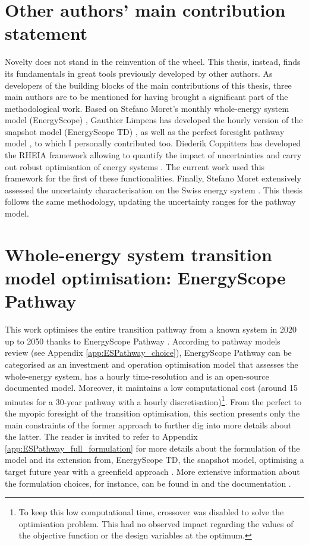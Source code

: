 \section*{Other authors' main contribution statement}
Novelty does not stand in the reinvention of the wheel.  This thesis, instead, finds its fundamentals in great tools previously developed by other authors. As developers of the building blocks of the main contributions of this thesis, three main authors are to be mentioned for having brought a significant part of the methodological work. Based on Stefano Moret's monthly whole-energy system model (\ie EnergyScope) \cite{moret2016strategic}, Gauthier Limpens has developed the hourly version of the snapshot model (\ie EnergyScope TD) \cite{limpens2019energyscope}, as well as the perfect foresight pathway model \cite{limpens2024pathway}, to which I personally contributed too. Diederik Coppitters has developed the RHEIA framework allowing to quantify the impact of uncertainties and carry out robust optimisation of energy systems \cite{coppittersthesis}. The current work used this framework for the first of these functionalities. Finally, Stefano Moret extensively assessed the uncertainty characterisation on the Swiss energy system \cite{Moret2017}. This thesis follows the same methodology, updating the uncertainty ranges for the pathway model.

\section[EnergyScope Pathway]{Whole-energy system transition model optimisation: EnergyScope Pathway}
\label{sec:meth:ES}

This work optimises the entire transition pathway from a known system in 2020 up to 2050 thanks to EnergyScope Pathway \cite{limpens2024pathway}. According to pathway models review (see Appendix \ref{app:ESPathway_choice}), EnergyScope Pathway can be categorised as an investment and operation optimisation model that assesses the whole-energy system, has a hourly time-resolution and is an open-source documented model. Moreover, it maintains a low computational cost (\ie around 15 minutes for a 30-year pathway with a hourly discretisation)\footnote{To keep this low computational time, crossover was disabled to solve the optimisation problem. This had no observed impact regarding the values of the objective function or the design variables at the optimum.}. From the perfect to the myopic foresight of the transition optimisation, this section presents only the main constraints of the former approach to further dig into more details about the latter. The reader is invited to refer to Appendix \ref{app:ESPathway_full_formulation} for more details about the formulation of the model and its extension from, EnergyScope TD, the snapshot model, optimising a target future year with a greenfield approach \cite{geidl2006greenfield}. More extensive information about the formulation choices, for instance, can be found in \cite{limpens2024pathway} and the documentation \cite{readthedocs_pathway}.

